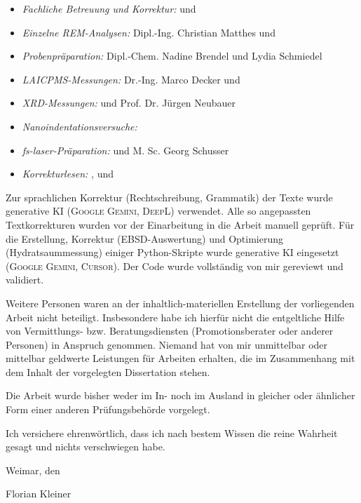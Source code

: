   \begin{itemize}
    \item \textit{Fachliche Betreuung und Korrektur:}  und 
    \item \textit{Einzelne REM-Analysen:} Dipl.-Ing. Christian Matthes und 
    \item \textit{Probenpräparation:} Dipl.-Chem. Nadine Brendel und Lydia Schmiedel
    \item \textit{\acs*{LAICPMS}-Messungen:} Dr.-Ing. Marco Decker und 
    \item \textit{\acs*{XRD}-Messungen:}  und Prof. Dr. Jürgen Neubauer
    \item \textit{Nanoindentationsversuche:} 
    \item \textit{\acs*{fs-laser}-Präparation:}  und M. Sc. Georg Schusser
    \item \textit{Korrekturlesen:} ,  und 
  \end{itemize}
\fi


Zur sprachlichen Korrektur (Rechtschreibung, Grammatik) der Texte wurde generative KI (\textsc{Google Gemini}, \textsc{DeepL}) verwendet.
Alle so angepassten Textkorrekturen wurden vor der Einarbeitung in die Arbeit manuell geprüft.
Für die Erstellung, Korrektur (\acs*{EBSD}-Auswertung) und Optimierung (Hydratsaummessung) einiger Python-Skripte  wurde generative KI eingesetzt (\textsc{Google Gemini}, \textsc{Cursor}).
Der Code wurde vollständig von mir gereviewt und validiert.

Weitere Personen waren an der inhaltlich-materiellen Erstellung der vorliegenden Arbeit nicht beteiligt. 
Insbesondere habe ich hierfür nicht die entgeltliche Hilfe von Vermittlungs- bzw. Beratungsdiensten (Promotionsberater oder anderer Personen) in Anspruch genommen.
Niemand hat von mir unmittelbar oder mittelbar geldwerte Leistungen für Arbeiten erhalten, die im Zusammenhang mit dem Inhalt der vorgelegten Dissertation stehen.

Die Arbeit wurde bisher weder im In- noch im Ausland in gleicher oder ähnlicher Form einer anderen Prüfungsbehörde vorgelegt.

Ich versichere ehrenwörtlich, dass ich nach bestem Wissen die reine Wahrheit gesagt und nichts verschwiegen habe.

  \vspace{1cm}

  Weimar, den \todayde \par

  \vspace{2cm}

  Florian Kleiner
